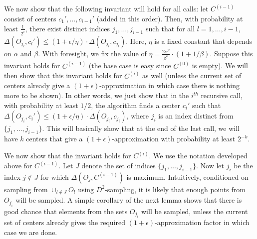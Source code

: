 \documentclass[11pt]{article}
\newcommand{\eps}{{\epsilon}}
\newcommand{\C}[1]{{{C}^{(#1)}}}
\begin{document}
We now show that the following invariant will hold for all calls: let $\C{i-1}$ consist of centers
$c_1', \ldots, c_{i-1}'$ (added in this order). 
Then, with probability at least $\frac{1}{2^{i}}$, there exist distinct indices $j_1, \ldots, j_{i-1}$ such that for all $l = 1, \ldots, i-1$, $\Delta(O_{j_l},c_l') \leq (1 + \eps/\eta) \cdot \Delta(O_{j_l},c_{j_l})$.
Here, $\eta$ is a fixed constant that depends on $\alpha$ and $\beta$. With foresight, we fix the value of $\eta = \frac{2 \alpha^2}{\beta^2} \cdot (1 + 1/\beta)$.
Suppose this invariant holds for $\C{i-1}$ (the base case is easy since $\C{0}$ is empty).
We will then show that this invariant holds for $\C{i}$ as well (unless the current set of centers already give a $(1+\eps)$-approximation in which case there is nothing more to be shown). 
In other words, we just show that in the $i^{th}$ recursive call, with probability at least $1/2$,  the algorithm finds a center $c_{i}'$  such that
$ \Delta(O_{j_i},c_i') \leq (1 + \eps/\eta) \cdot \Delta(O_{j_i},c_{j_i})$, where $j_i$ is an index distinct from
$\{j_1, \ldots, j_{i-1}\}$.
This will basically show that at the end of the last call, we will have $k$ centers that give a $(1 + \eps)$-approximation with probability at least $2^{- k}$.


We now show that the invariant holds for $\C{i}$. We use the notation developed above for $\C{i-1}$. 
Let $J$ denote the set of indices $\{j_1, \ldots, j_{i-1}\}$. 
Now let $j_i$ be the index $j \notin J$ for which $\Delta(O_j, \C{i-1})$
is maximum. 
Intuitively, conditioned on sampling from $\cup_{l \notin J}O_{l}$ using $D^2$-sampling, it is  likely that
enough points from $O_{j_i}$ will be sampled.
A simple corollary of the next lemma shows that there is good chance that elements from the sets $O_{j_i}$ will be sampled, unless the current set of centers already gives the required $(1+\eps)$-approximation factor in which case we are done.
\end{document}
